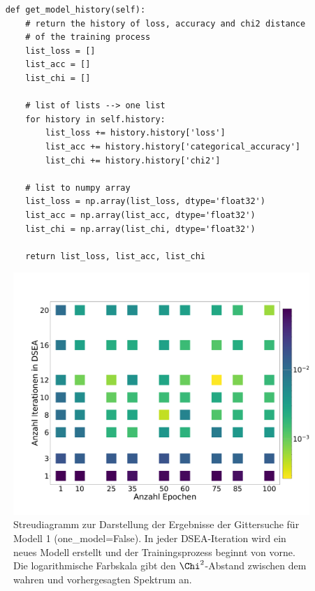 \begin{lstlisting}
    def get_model_history(self):
        # return the history of loss, accuracy and chi2 distance
        # of the training process
        list_loss = []
        list_acc = []
        list_chi = []

        # list of lists --> one list
        for history in self.history:
            list_loss += history.history['loss']
            list_acc += history.history['categorical_accuracy']
            list_chi += history.history['chi2']

        # list to numpy array
        list_loss = np.array(list_loss, dtype='float32')
        list_acc = np.array(list_acc, dtype='float32')
        list_chi = np.array(list_chi, dtype='float32')

        return list_loss, list_acc, list_chi
\end{lstlisting}

\begin{figure}
    \centering
    \includegraphics[width=1\textwidth]{Plots/DSEA/False/scatter_chi2.pdf}
    \caption[Ergebnisse der Gittersuche für mehrere (Anzahl: $n_\text{Iterationen}$) NN in DSEA]{Streudiagramm zur Darstellung der Ergebnisse der Gittersuche für Modell 1 (one\_model=False).
    In jeder DSEA-Iteration wird ein neues Modell erstellt und der Trainingsprozess beginnt von vorne.
    Die logarithmische Farbskala gibt den $\Chi^2$-Abstand zwischen dem wahren und vorhergesagten Spektrum an.
    }
    \label{fig:scatter_false}
\end{figure}

